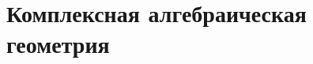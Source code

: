 \documentclass[dvipsnames, 11pt]{article}
\begin{document}
    
    
    
    
    
    
    
    


    \newpage
    \section{Комплексная алгебраическая геометрия}
    
    
    

    
\end{document}
